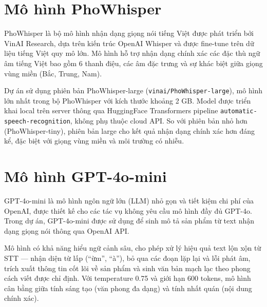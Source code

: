 \section{Mô hình PhoWhisper}

PhoWhisper là bộ mô hình nhận dạng giọng nói tiếng Việt được phát triển
bởi VinAI Research, dựa trên kiến trúc OpenAI Whisper và được fine-tune
trên dữ liệu tiếng Việt quy mô lớn. Mô hình hỗ trợ nhận dạng chính xác
các đặc thù ngữ âm tiếng Việt bao gồm 6 thanh điệu, các âm đặc trưng
và sự khác biệt giữa giọng vùng miền (Bắc, Trung, Nam).

Dự án sử dụng phiên bản PhoWhisper-large (\texttt{vinai/PhoWhisper-large}),
mô hình lớn nhất trong bộ PhoWhisper với kích thước khoảng 2 GB. Model
được triển khai local trên server thông qua HuggingFace Transformers
pipeline \texttt{automatic-speech-recognition}, không phụ thuộc cloud API.
So với phiên bản nhỏ hơn (PhoWhisper-tiny), phiên bản large cho kết quả
nhận dạng chính xác hơn đáng kể, đặc biệt với giọng vùng miền và môi
trường có nhiễu.

\section{Mô hình GPT-4o-mini}

GPT-4o-mini là mô hình ngôn ngữ lớn (LLM) nhỏ gọn và tiết kiệm chi phí
của OpenAI, được thiết kế cho các tác vụ không yêu cầu mô hình đầy đủ
GPT-4o. Trong dự án, GPT-4o-mini được sử dụng để sinh mô tả sản phẩm
từ text nhận dạng giọng nói thông qua OpenAI API.

Mô hình có khả năng hiểu ngữ cảnh sâu, cho phép xử lý hiệu quả text
lộn xộn từ STT --- nhận diện từ lấp (``ừm'', ``à''), bỏ qua các đoạn
lặp lại và lỗi phát âm, trích xuất thông tin cốt lõi về sản phẩm và
sinh văn bản mạch lạc theo phong cách viết được chỉ định. Với temperature
0.75 và giới hạn 600 tokens, mô hình cân bằng giữa tính sáng tạo (văn
phong đa dạng) và tính nhất quán (nội dung chính xác).

